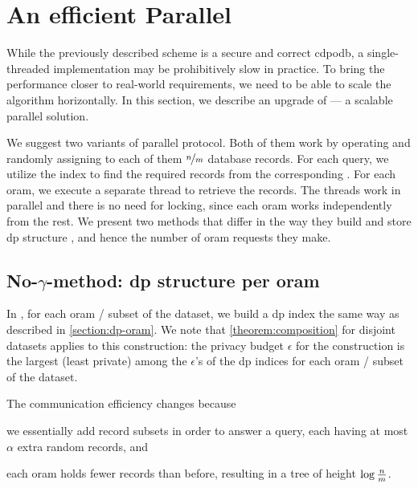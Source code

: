 \section{An efficient Parallel \texorpdfstring{\epsolute{}}{Epsolute}}\label{section:prallel-dp-oram}

	While the previously described scheme is a secure and correct \acrshort{cdpodb}, a single-threaded implementation may be prohibitively slow in practice.
	To bring the performance closer to real-world requirements, we need to be able to scale the algorithm horizontally.
	In this section, we describe an upgrade of \epsolute{} --- a scalable parallel solution.

	We suggest two variants of parallel \epsolute{} protocol.
	Both of them work by operating \oramsNumber{}  and randomly assigning to each of them $\nicefrac{n}{m}$ database records.
	For each query, we utilize the index \indexI{} to find the required records from the corresponding .
	For each \acrshort{oram}, we execute a separate thread to retrieve the records.
	The threads work in parallel and there is no need for locking, since each \acrshort{oram} works independently from the rest.
	We present two methods that differ in the way they build and store \acrshort{dp} structure \serverDS{}, and hence the number of \acrshort{oram} requests they make.

	\subsection{\texorpdfstring{No-$\gamma$-method}{No-gamma-method}: \acrshort{dp} structure per \acrshort{oram}}

		In \protocolNoGamma{}, for each \acrshort{oram} / subset of the dataset, we build a \acrshort{dp} index the same way as described in \cref{section:dp-oram}.
		We note that \cref{theorem:composition} for disjoint datasets applies to this construction: the privacy budget $\epsilon$ for the construction is the largest (least private) among the $\epsilon$'s of the \acrshort{dp} indices for each \acrshort{oram} / subset of the dataset.

		The communication efficiency changes because
		\begin{enumerate*}[label={(\roman*)}]
			\item
				we essentially add \oramsNumber{} record subsets in order to answer a query, each having at most $\alpha$ extra random records, and
			\item
				each \acrshort{oram} holds fewer records than before, resulting in a tree of height $\log \frac{n}{m}$.
		\end{enumerate*}

